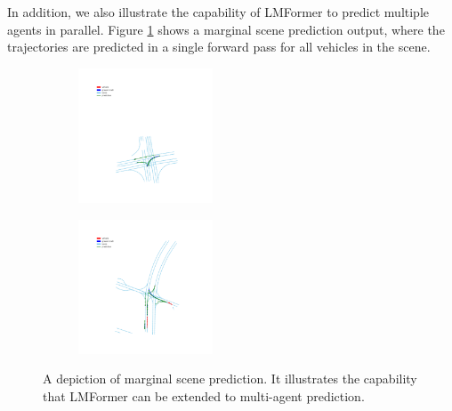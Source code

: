 In addition, we also illustrate the capability of LMFormer to predict multiple agents in parallel. Figure \ref{fig:scene_prediction} shows a marginal scene prediction output, where the trajectories are predicted in a single forward pass for all vehicles in the scene. 
\begin{figure}
    \centering
    \begin{subfigure}[t]{0.4\linewidth}
        \includegraphics[height=4cm,trim={270 100 250 350},clip]{images_results/0044aaa230fe4cbeb4b744031e33af29_fb907b8b05644df28d64d6e25e9a956c_2-min.png}
    \end{subfigure}
    \begin{subfigure}[t]{0.2\linewidth}
        \includegraphics[height=4cm,trim={280 130 240 300},clip]{images_results/6c245e7d868c4be5a9c23c816701b103_c03d17123c6345f1a4626c6245b2c962_2-min.png}
    \end{subfigure}
    \caption{A depiction of marginal scene prediction. It illustrates the capability that LMFormer can be extended to multi-agent prediction.}
    \label{fig:scene_prediction}    
\end{figure}


